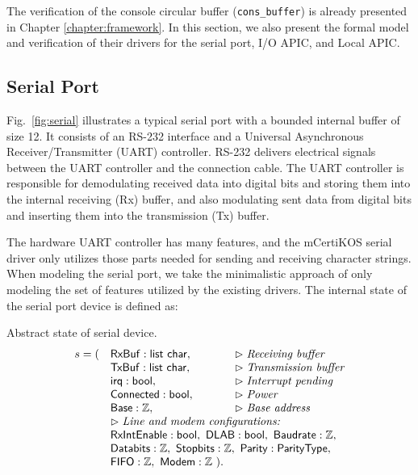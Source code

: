 The verification of the console circular buffer (\texttt{cons\_buffer}) is
already presented in Chapter \ref{chapter:framework}. In this section, we also present
the formal model and verification of their drivers for the serial port, I/O
APIC, and Local APIC.

\subsection{Serial Port}

Fig.~\ref{fig:serial} illustrates a typical serial port with a bounded internal
buffer of size 12. It consists of an RS-232 interface and a Universal
Asynchronous Receiver/Transmitter (UART) controller. RS-232 delivers electrical
signals between the UART controller and the connection cable. The UART controller
is responsible for demodulating received data into digital bits and storing them
into the internal receiving (Rx) buffer, and also modulating sent data from
digital bits and inserting them into the transmission (Tx) buffer.

The hardware UART controller has many features, and the mCertiKOS serial driver
only utilizes those parts needed for sending and receiving character strings.
When modeling the serial port, we take the minimalistic approach of only
modeling the set of features utilized by the existing drivers. The internal
state of the serial port device is defined as:

\begin{definition} \label{def:serial-device}
	Abstract state of serial device.
\[
\begin{array}{lll}
s = ( & \mathsf{RxBuf}: \mathsf{list} ~ \mathsf{char}, & \vartriangleright \textit{Receiving buffer} \\
 & \mathsf{TxBuf}: \mathsf{list} ~ \mathsf{char}, & \vartriangleright \textit{Transmission buffer} \\
 & \mathsf{irq}: \mathsf{bool}, & \vartriangleright \textit{Interrupt pending} \\
 & \mathsf{Connected}: \mathsf{bool}, & \vartriangleright \textit{Power} \\
 & \mathsf{Base}: \mathbb{Z}, & \vartriangleright \textit{Base address} \\
 & \multicolumn{2}{l} {\vartriangleright \textit{Line and modem configurations:}} \\
 & \multicolumn{2}{l}{\mathsf{RxIntEnable}: \mathsf{bool}, ~ \mathsf{DLAB}: \mathsf{bool}, ~ \mathsf{Baudrate}: \mathbb{Z},} \\
 & \multicolumn{2}{l}{\mathsf{Databits}: \mathbb{Z}, ~ \mathsf{Stopbits}: \mathbb{Z}, ~ \mathsf{Parity}: \mathsf{ParityType},} \\
 & \mathsf{FIFO}: \mathbb{Z}, ~ \mathsf{Modem}: \mathbb{Z} ~). \\
\end{array}
\]
\end{definition}
		
